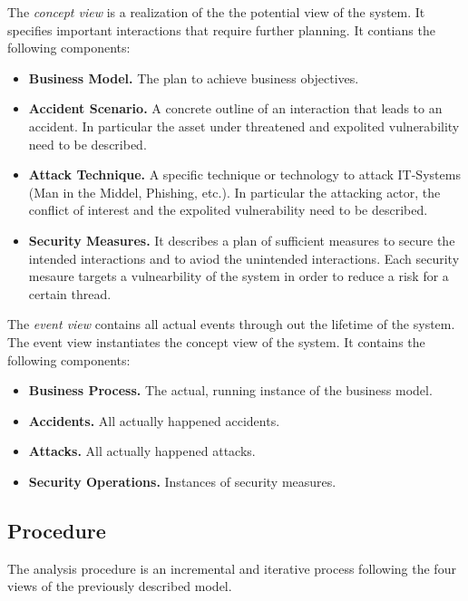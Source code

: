 The \emph{concept view} is a realization of the the potential view of the system.
It specifies important interactions that require further planning.
It contians the following components:
\begin{itemize}
\item \textbf{Business Model.}
The plan to achieve business objectives.

\item \textbf{Accident Scenario.}
A concrete outline of an interaction that leads to an accident.
In particular the asset under threatened and expolited vulnerability need to be described.

\item \textbf{Attack Technique.}
A specific technique or technology to attack IT-Systems (Man in the Middel, Phishing, etc.).
In particular the attacking actor, the conflict of interest and the expolited vulnerability need to be described.

\item \textbf{Security Measures.}
It describes a plan of sufficient measures to secure the intended interactions and to aviod the unintended interactions.
Each security mesaure targets a vulnearbility of the system in order to reduce a risk for a certain thread.
\end{itemize}



The \emph{event view} contains all actual events through out the lifetime of the system.
The event view instantiates the concept view of the system.
It contains the following components:
\begin{itemize}
\item \textbf{Business Process.}
The actual, running instance of the business model.

\item \textbf{Accidents.}
All actually happened accidents.

\item \textbf{Attacks.}
All actually happened attacks.

\item \textbf{Security Operations.}
Instances of security measures.
\end{itemize}




\subsection{Procedure}

The analysis procedure is an incremental and iterative process following the four views of the previously described model.

